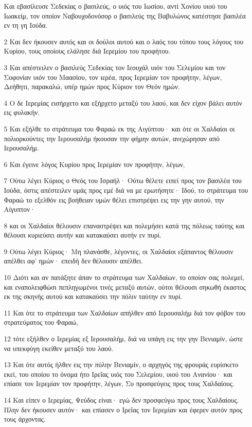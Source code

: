 \par Και εβασίλευσε Σεδεκίας ο βασιλεύς, ο υιός του Ιωσίου, αντί Χονίου υιού του Ιωακείμ, τον οποίον Ναβουχοδονόσορ ο βασιλεύς της Βαβυλώνος κατέστησε βασιλέα εν τη γη Ιούδα.
\par 2 Και δεν ήκουσεν αυτός και οι δούλοι αυτού και ο λαός του τόπου τους λόγους του Κυρίου, τους οποίους ελάλησε διά Ιερεμίου του προφήτου.
\par 3 Και απέστειλεν ο βασιλεύς Σεδεκίας τον Ιεουχάλ υιόν του Σελεμίου και τον Σοφονίαν υιόν του Μαασίου, τον ιερέα, προς Ιερεμίαν τον προφήτην, λέγων, Δεήθητι, παρακαλώ, υπέρ ημών προς Κύριον τον Θεόν ημών.
\par 4 Ο δε Ιερεμίας εισήρχετο και εξήρχετο μεταξύ του λαού, και δεν είχον βάλει αυτόν εις φυλακήν.
\par 5 Και εξήλθε το στράτευμα του Φαραώ εκ της Αιγύπτου· και ότε οι Χαλδαίοι οι πολιορκούντες την Ιερουσαλήμ ήκουσαν την φήμην αυτών, ανεχώρησαν από Ιερουσαλήμ.
\par 6 Και έγεινε λόγος Κυρίου προς Ιερεμίαν τον προφήτην, λέγων,
\par 7 Ούτω λέγει Κύριος ο Θεός του Ισραήλ· Ούτω θέλετε ειπεί προς τον βασιλέα του Ιούδα, όστις απέστειλεν υμάς προς εμέ διά να με ερωτήσητε· Ιδού, το στράτευμα του Φαραώ το εξελθόν εις βοήθειαν υμών θέλει επιστρέψει εις την γην αυτού, την Αίγυπτον·
\par 8 και οι Χαλδαίοι θέλουσιν επαναστρέψει και πολεμήσει κατά της πόλεως ταύτης και θέλουσι κυριεύσει αυτήν και κατακαύσει αυτήν εν πυρί.
\par 9 Ούτω λέγει Κύριος· Μη πλανάσθε, λέγοντες, οι Χαλδαίοι εξάπαντος θέλουσιν απέλθει αφ' ημών· επειδή δεν θέλουσιν απέλθει.
\par 10 Διότι και αν πατάξητε άπαν το στράτευμα των Χαλδαίων, το οποίον σας πολεμεί, και εναπολειφθώσι πεπληγωμένοι τινές μεταξύ αυτών, ούτοι θέλουσι σηκωθή έκαστος εκ της σκηνής αυτού και κατακαύσει την πόλιν ταύτην εν πυρί.
\par 11 Και ότε το στράτευμα των Χαλδαίων απήλθεν από Ιερουσαλήμ διά τον φόβον του στρατεύματος του Φαραώ,
\par 12 τότε εξήλθεν ο Ιερεμίας εξ Ιερουσαλήμ, διά να υπάγη εις την γην Βενιαμίν, ώστε να υπεκφύγη εκείθεν μεταξύ του λαού.
\par 13 Και ότε αυτός ήλθεν εις την πύλην Βενιαμίν, ο αρχηγός της φρουράς ευρίσκετο εκεί, του οποίου το όνομα ήτο Ιρεΐας υιός του Σελεμίου, υιού του Ανανίου· και επίασε τον Ιερεμίαν τον προφήτην, λέγων, Συ προσφεύγεις προς τους Χαλδαίους.
\par 14 Και είπεν ο Ιερεμίας, Ψεύδος είναι· εγώ δεν προσφεύγω προς τους Χαλδαίους. Πλην δεν ήκουσεν αυτόν· και επίασεν ο Ιρεΐας τον Ιερεμίαν και έφερεν αυτόν προς τους άρχοντας.
